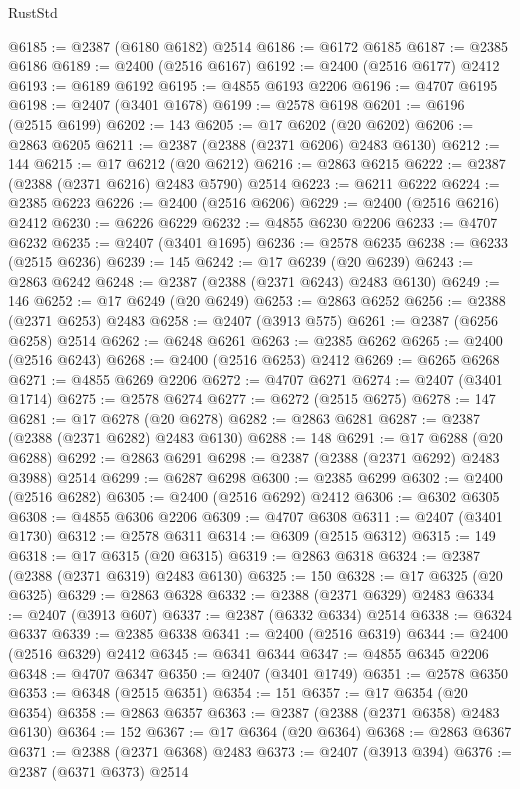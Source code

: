 \begin{lexlean}{RustStd}
\begin{coremodule}
@6185 := @2387 (@6180 @6182) @2514
@6186 := @6172 @6185
@6187 := @2385 @6186
@6189 := @2400 (@2516 @6167)
@6192 := @2400 (@2516 @6177) @2412
@6193 := @6189 @6192
@6195 := @4855 @6193 @2206
@6196 := @4707 @6195
@6198 := @2407 (@3401 @1678)
@6199 := @2578 @6198
@6201 := @6196 (@2515 @6199)
@6202 := 143
@6205 := @17 @6202 (@20 @6202)
@6206 := @2863 @6205
@6211 := @2387 (@2388 (@2371 @6206) @2483 @6130)
@6212 := 144
@6215 := @17 @6212 (@20 @6212)
@6216 := @2863 @6215
@6222 := @2387 (@2388 (@2371 @6216) @2483 @5790) @2514
@6223 := @6211 @6222
@6224 := @2385 @6223
@6226 := @2400 (@2516 @6206)
@6229 := @2400 (@2516 @6216) @2412
@6230 := @6226 @6229
@6232 := @4855 @6230 @2206
@6233 := @4707 @6232
@6235 := @2407 (@3401 @1695)
@6236 := @2578 @6235
@6238 := @6233 (@2515 @6236)
@6239 := 145
@6242 := @17 @6239 (@20 @6239)
@6243 := @2863 @6242
@6248 := @2387 (@2388 (@2371 @6243) @2483 @6130)
@6249 := 146
@6252 := @17 @6249 (@20 @6249)
@6253 := @2863 @6252
@6256 := @2388 (@2371 @6253) @2483
@6258 := @2407 (@3913 @575)
@6261 := @2387 (@6256 @6258) @2514
@6262 := @6248 @6261
@6263 := @2385 @6262
@6265 := @2400 (@2516 @6243)
@6268 := @2400 (@2516 @6253) @2412
@6269 := @6265 @6268
@6271 := @4855 @6269 @2206
@6272 := @4707 @6271
@6274 := @2407 (@3401 @1714)
@6275 := @2578 @6274
@6277 := @6272 (@2515 @6275)
@6278 := 147
@6281 := @17 @6278 (@20 @6278)
@6282 := @2863 @6281
@6287 := @2387 (@2388 (@2371 @6282) @2483 @6130)
@6288 := 148
@6291 := @17 @6288 (@20 @6288)
@6292 := @2863 @6291
@6298 := @2387 (@2388 (@2371 @6292) @2483 @3988) @2514
@6299 := @6287 @6298
@6300 := @2385 @6299
@6302 := @2400 (@2516 @6282)
@6305 := @2400 (@2516 @6292) @2412
@6306 := @6302 @6305
@6308 := @4855 @6306 @2206
@6309 := @4707 @6308
@6311 := @2407 (@3401 @1730)
@6312 := @2578 @6311
@6314 := @6309 (@2515 @6312)
@6315 := 149
@6318 := @17 @6315 (@20 @6315)
@6319 := @2863 @6318
@6324 := @2387 (@2388 (@2371 @6319) @2483 @6130)
@6325 := 150
@6328 := @17 @6325 (@20 @6325)
@6329 := @2863 @6328
@6332 := @2388 (@2371 @6329) @2483
@6334 := @2407 (@3913 @607)
@6337 := @2387 (@6332 @6334) @2514
@6338 := @6324 @6337
@6339 := @2385 @6338
@6341 := @2400 (@2516 @6319)
@6344 := @2400 (@2516 @6329) @2412
@6345 := @6341 @6344
@6347 := @4855 @6345 @2206
@6348 := @4707 @6347
@6350 := @2407 (@3401 @1749)
@6351 := @2578 @6350
@6353 := @6348 (@2515 @6351)
@6354 := 151
@6357 := @17 @6354 (@20 @6354)
@6358 := @2863 @6357
@6363 := @2387 (@2388 (@2371 @6358) @2483 @6130)
@6364 := 152
@6367 := @17 @6364 (@20 @6364)
@6368 := @2863 @6367
@6371 := @2388 (@2371 @6368) @2483
@6373 := @2407 (@3913 @394)
@6376 := @2387 (@6371 @6373) @2514

\end{coremodule}
\end{lexlean}
